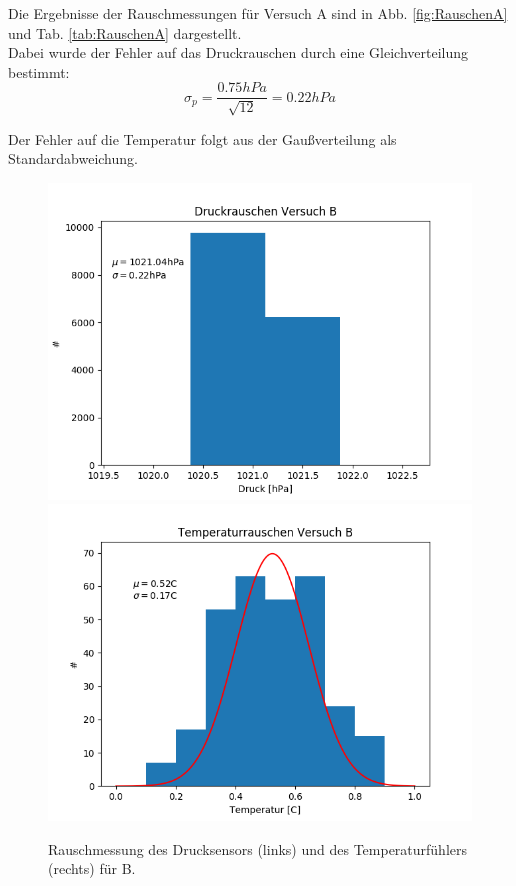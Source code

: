 \documentclass[12pt,a4paper]{article}
\begin{document}
Die Ergebnisse der Rauschmessungen für Versuch A sind in Abb. \ref{fig:RauschenA} und Tab. \ref{tab:RauschenA} dargestellt.\\
Dabei wurde der Fehler auf das Druckrauschen durch eine Gleichverteilung bestimmt:
\begin{equation}
\sigma_p =\dfrac{0.75hPa}{\sqrt{12}} = 0.22hPa
\end{equation}

Der Fehler auf die Temperatur folgt aus der Gaußverteilung als Standardabweichung.






\begin{figure}[H]
\includegraphics[scale=0.5]{Bilder/DruckrauschenB}
\includegraphics[scale=0.5]{Bilder/TemprauschenB}
\caption[Rauschmessung Versuch B]{Rauschmessung des Drucksensors (links) und des Temperaturfühlers (rechts) für B.}
\label{fig:RauschenB}
\end{figure}
\end{document}
